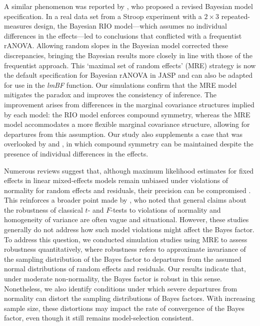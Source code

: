 \documentclass[preprint,12pt,authoryear]{elsarticle}
\begin{document}
A similar phenomenon was reported by \citet{van_den_bergh_bayesian_2023}, who proposed a revised Bayesian model specification. In a real data set from a Stroop experiment with a $2\times3$ repeated-measures design, the Bayesian RIO model—which assumes no individual differences in the effects—led to conclusions that conflicted with a frequentist rANOVA. Allowing random slopes in the Bayesian model corrected these discrepancies, bringing the Bayesian results more closely in line with those of the frequentist approach. This `maximal set of random effects' (MRE) strategy is now the default specification for Bayesian rANOVA in JASP \citep[version 0.16.3 and later;][]{jasp_team_jasp_2025} and can also be adapted for use in the \textit{lmBF} function. Our simulations confirm that the MRE model mitigates the paradox and improves the consistency of inference. The improvement arises from differences in the marginal covariance structures implied by each model: the RIO model enforces compound symmetry, whereas the MRE model accommodates a more flexible marginal covariance structure, allowing for departures from this assumption. Our study also supplements a case that was overlooked by \citet{oberauer_importance_2022} and \citet{van_den_bergh_bayesian_2023}, in which compound symmetry can be maintained despite the presence of individual differences in the effects.

Numerous reviews suggest that, although maximum likelihood estimates for fixed effects in linear mixed-effects models remain unbiased under violations of normality for random effects and residuals, their precision can be compromised \citep[e.g.,][]{arnau_effect_2013,jacqmin-gadda_robustness_2007,lebeau_model_2018,maas_robustness_2004,mcculloch_misspecifying_2011,schielzeth_robustness_2020,verbeke_effect_1997}. This reinforces a broader point made by \citet{bradley_robustness_1978}, who noted that general claims about the robustness of classical $t$- and $F$-tests to violations of normality and homogeneity of variance are often vague and situational. However, these studies generally do not address how such model violations might affect the Bayes factor. To address this question, we conducted simulation studies using MRE to assess robustness quantitatively, where robustness refers to approximate invariance of the sampling distribution of the Bayes factor to departures from the assumed normal distributions of random effects and residuals. Our results indicate that, under moderate non-normality, the Bayes factor is robust in this sense. Nonetheless, we also identify conditions under which severe departures from normality can distort the sampling distributions of Bayes factors. With increasing sample size, these distortions may impact the rate of convergence of the Bayes factor, even though it still remains model-selection consistent.
\end{document}
